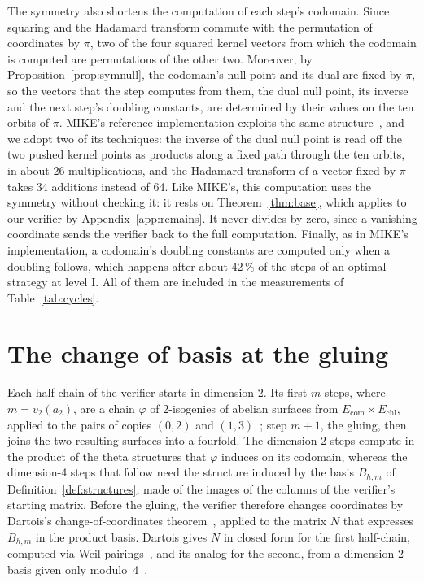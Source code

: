 \documentclass[version=preprint]{iacrcc}
\newcommand{\Ecom}{E_{\mathrm{com}}}
\newcommand{\Echl}{E_{\mathrm{chl}}}
\begin{document}
    The symmetry also shortens the computation of each step's codomain. Since
    squaring and the Hadamard transform commute with the permutation of
    coordinates by $\pi$, two of the four squared kernel vectors from which the
    codomain is computed are permutations of the other two. Moreover, by
    Proposition~\ref{prop:symnull}, the codomain's null point and its dual are
    fixed by $\pi$, so the vectors that the step computes from them, the dual
    null point, its inverse and the next step's doubling constants, are
    determined by their values on the ten orbits of $\pi$. MIKE's reference
    implementation exploits the same structure~\cite{BDD+26}, and we adopt two
    of its techniques: the inverse of the dual null point is read off the two
    pushed kernel points as products along a fixed path through the ten orbits,
    in about 26 multiplications, and the Hadamard transform of a vector fixed by
    $\pi$ takes 34 additions instead of 64. Like MIKE's, this computation uses
    the symmetry without checking it: it rests on Theorem~\ref{thm:base}, which
    applies to our verifier by Appendix~\ref{app:remains}. It never divides by zero, since a vanishing
    coordinate sends the verifier back to the full computation. Finally, as in
    MIKE's implementation, a codomain's doubling constants are computed only
    when a doubling follows, which happens after about 42\,\% of the steps of an
    optimal strategy at level I. All of them are included in the measurements of
    Table~\ref{tab:cycles}.

    \section{The change of basis at the gluing}
    \label{sec:gluing}

    Each half-chain of the verifier starts in dimension 2. Its first $m$
    steps, where $m = v_2(a_2)$, are a chain $\varphi$ of 2-isogenies of abelian
    surfaces from $\Ecom \times \Echl$, applied to the pairs of copies $(0, 2)$
    and $(1, 3)$~\cite[Lemmas 23 and 28]{Dar24}; step $m + 1$, the gluing, then
    joins the two resulting surfaces into a fourfold. The dimension-2 steps
    compute in the product of the theta structures that $\varphi$ induces on
    its codomain, whereas the dimension-4 steps that follow need the structure
    induced by the basis $B_{h,m}$ of Definition~\ref{def:structures}, made of
    the images of the columns of the verifier's starting matrix. Before the
    gluing, the verifier therefore changes coordinates by Dartois's
    change-of-coordinates theorem~\cite[Theorem 12]{Dar24}, applied to the matrix
    $N$ that expresses $B_{h,m}$ in the product basis. Dartois gives $N$ in
    closed form for the first half-chain, computed via Weil
    pairings~\cite[Lemma 30]{Dar24}, and its analog for the second, from a
    dimension-2 basis given only modulo~4~\cite[Lemma 31 and Appendix
    C.1]{Dar24}.
\end{document}
